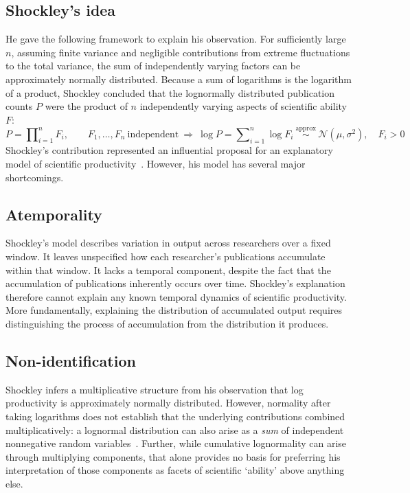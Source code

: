 \documentclass{article}
\begin{document}
\subsection*{Shockley's idea}\label{subsec:intro_shockley}
He gave the following framework to explain his observation. For sufficiently large $n$, assuming finite variance and negligible contributions from extreme fluctuations to the total variance, the sum of independently varying factors can be approximately normally distributed. Because a sum of logarithms is the logarithm of a product, Shockley concluded that the lognormally distributed publication counts $P$ were the product of $n$ independently varying aspects of scientific ability $F$:
\begin{equation}
P=\prod\nolimits_{i=1}^{n}F_i,
\qquad
F_1,\ldots,F_n\ \text{independent}
\ \Longrightarrow\ 
\log P=\sum\nolimits_{i=1}^{n}\log F_i \ 
\overset{\mathrm{approx}}{\sim} \
\mathcal{N}(\mu,\sigma^2), \quad F_i > 0
\label{eq:shockley_model}
\end{equation}
Shockley's contribution represented an influential proposal for an explanatory model of scientific productivity~\cite{shockley_in_modern_science_of_science_wang2021}. However, his model has several major shortcomings.

\subsection*{Atemporality}\label{subsec:intro_atemp}
Shockley's model describes variation in output across researchers over a fixed window. It leaves unspecified how each researcher's publications accumulate within that window. It lacks a temporal component, despite the fact that the accumulation of publications inherently occurs over time. Shockley's explanation therefore cannot explain any known temporal dynamics of scientific productivity. More fundamentally, explaining the distribution of accumulated output requires distinguishing the process of accumulation from the distribution it produces.
\subsection*{Non-identification}\label{subsec:intro_nonID}
Shockley infers a multiplicative structure from his observation that log productivity is approximately normally distributed. However, normality after taking logarithms does not establish that the underlying contributions combined multiplicatively: a lognormal distribution can also arise as a \emph{sum} of independent nonnegative random variables~\cite{thorinInfiniteDivisibilityLognormal1977}. Further, while cumulative lognormality can arise through multiplying components, that alone provides no basis for preferring his interpretation of those components as facets of scientific `ability' above anything else. 
\end{document}
